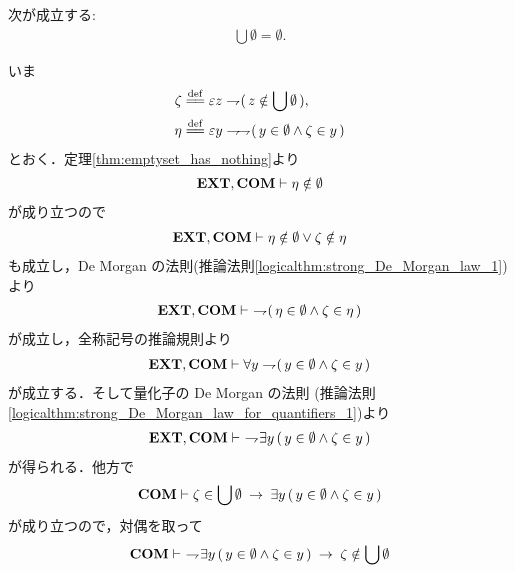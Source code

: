 	\begin{screen}
		\begin{thm}[空集合の合併は空]\label{thm:the_union_of_the_emptyset_is_empty}
			次が成立する:
			\begin{align}
				\bigcup \emptyset = \emptyset.
			\end{align}
		\end{thm}
	\end{screen}
	
	\begin{sketch}
		いま
		\begin{align}
			\zeta &\defeq \varepsilon z \negation (\, z \notin \bigcup \emptyset\, ), \\
			\eta &\defeq \varepsilon y \negation \negation (\, y \in \emptyset \wedge \zeta \in y\, )
		\end{align}
		とおく．定理\ref{thm:emptyset_has_nothing}より
		\begin{align}
			\mbox{{\bf EXT}},\mbox{\bf COM} \vdash \eta \notin \emptyset
		\end{align}
		が成り立つので
		\begin{align}
			\mbox{{\bf EXT}},\mbox{\bf COM} \vdash \eta \notin \emptyset \vee \zeta \notin \eta
		\end{align}
		も成立し，De Morgan の法則(推論法則\ref{logicalthm:strong_De_Morgan_law_1})より
		\begin{align}
			\mbox{{\bf EXT}},\mbox{\bf COM} \vdash\ \rightharpoondown\hspace{-0.25em} (\, \eta \in \emptyset \wedge \zeta \in \eta\, )
		\end{align}
		が成立し，全称記号の推論規則より
		\begin{align}
			\mbox{{\bf EXT}},\mbox{\bf COM} \vdash \forall y \rightharpoondown\hspace{-0.25em} (\, y \in \emptyset \wedge \zeta \in y\, )
		\end{align}
		が成立する．そして量化子の De Morgan の法則
		(推論法則\ref{logicalthm:strong_De_Morgan_law_for_quantifiers_1})より
		\begin{align}
			\mbox{{\bf EXT}},\mbox{\bf COM} \vdash\ \rightharpoondown\hspace{-0.25em} \exists y\, (\, y \in \emptyset \wedge \zeta \in y\, )
			\label{fom:the_union_of_the_emptyset_is_empty_1}
		\end{align}
		が得られる．他方で
		\begin{align}
			\mbox{\bf COM} \vdash \zeta \in \bigcup \emptyset
			\hspace{0.25em}\rightarrow\hspace{0.25em} \exists y\, (\, y \in \emptyset \wedge \zeta \in y\, )
		\end{align}
		が成り立つので，対偶を取って
		\begin{align}
			\COMAX \vdash\ 
			\negation \exists y\, (\, y \in \emptyset \wedge \zeta \in y\, )
			\rarrow \zeta \notin \bigcup \emptyset

\end{align}
\end{sketch}
